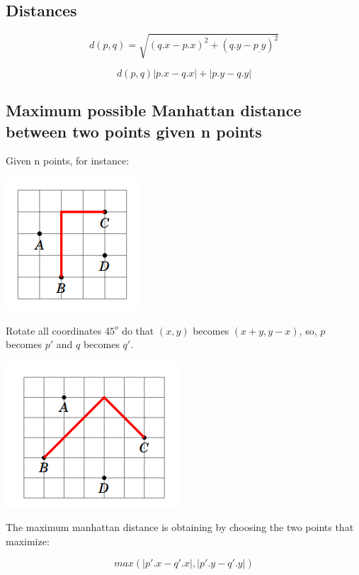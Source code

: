 \subsection{Distances}

$$ d(p,q) = {\sqrt {(q.x-p.x)^{2}+(q.y-p_.y)^{2}}} $$

$$ d(p,q) |p.x - q.x| + |p.y - q.y| $$

\subsection{Maximum possible Manhattan distance between two points given n points}

Given n points, for instance:
\begin{center}
  \includegraphics[scale=.6, keepaspectratio]{./theoretical/img/manhattan_before.png}
\end{center}

Rotate all coordinates $45^{o}$ do that $(x, y)$ becomes $(x+y, y-x)$, so, $p$ becomes $p'$ and $q$ becomes $q'$.
\begin{center}
  \includegraphics[scale=.6, keepaspectratio]{./theoretical/img/manhattan_after.png}
\end{center}

The maximum manhattan distance is obtaining by choosing the two points that maximize:

$$ max(|p'.x - q'.x|, |p'.y - q'.y|) $$